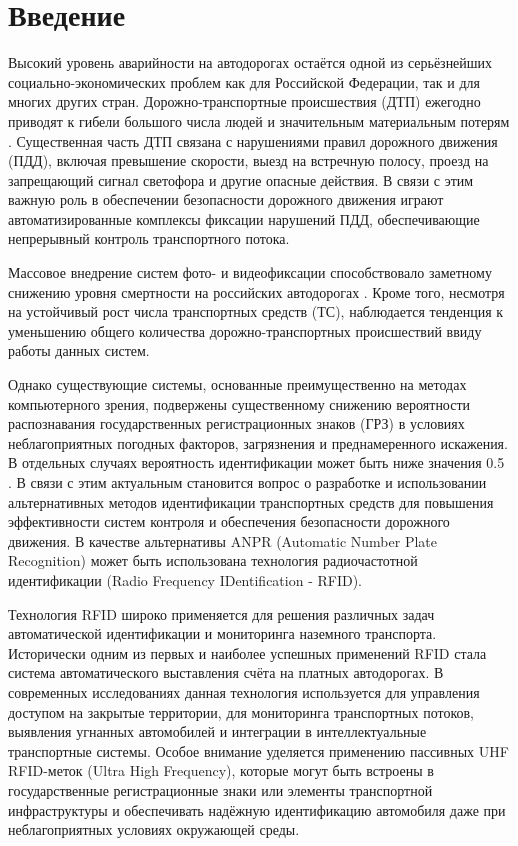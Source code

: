 \documentclass[12pt]{article}
\theoremstyle{definition}
\begin{document}
\setcounter{page}{2}

\tableofcontents
\pagebreak

\section*{Введение}

Высокий уровень аварийности на автодорогах остаётся одной из серьёзнейших социально-экономических проблем как для Российской Федерации, так и для многих других стран. Дорожно-транспортные происшествия (ДТП) ежегодно приводят к гибели большого числа людей и значительным материальным потерям \cite{DTP_analitica}. Существенная часть ДТП связана с нарушениями правил дорожного движения (ПДД), включая превышение скорости, выезд на встречную полосу, проезд на запрещающий сигнал светофора и другие опасные действия. В связи с этим важную роль в обеспечении безопасности дорожного движения играют автоматизированные комплексы фиксации нарушений ПДД, обеспечивающие непрерывный контроль транспортного потока.

Массовое внедрение систем фото- и видеофиксации способствовало заметному снижению уровня смертности на российских автодорогах \cite{HSE2021Cameras}. Кроме того, несмотря на устойчивый рост числа транспортных средств (ТС), наблюдается тенденция к уменьшению общего количества дорожно-транспортных происшествий ввиду работы данных систем.

Однако существующие системы, основанные преимущественно на методах компьютерного зрения, подвержены существенному снижению вероятности распознавания государственных регистрационных знаков (ГРЗ) в условиях неблагоприятных погодных факторов, загрязнения и преднамеренного искажения. В отдельных случаях вероятность идентификации может быть ниже значения 0.5 \cite{Plavac2024}. В связи с этим актуальным становится вопрос о разработке и использовании альтернативных методов идентификации транспортных средств для повышения эффективности систем контроля и обеспечения безопасности дорожного движения. В качестве альтернативы ANPR (Automatic Number Plate Recognition) может быть использована технология радиочастотной идентификации (Radio Frequency IDentification - RFID).

Технология RFID широко применяется для решения различных задач автоматической идентификации и мониторинга наземного транспорта. Исторически одним из первых и наиболее успешных применений RFID стала система автоматического выставления счёта на платных автодорогах. В современных исследованиях данная технология используется для управления доступом на закрытые территории, для мониторинга транспортных потоков, выявления угнанных автомобилей и интеграции в интеллектуальные транспортные системы. Особое внимание уделяется применению пассивных UHF RFID-меток (Ultra High Frequency), которые могут быть встроены в государственные регистрационные знаки или элементы транспортной инфраструктуры и обеспечивать надёжную идентификацию автомобиля даже при неблагоприятных условиях окружающей среды.
\end{document}
